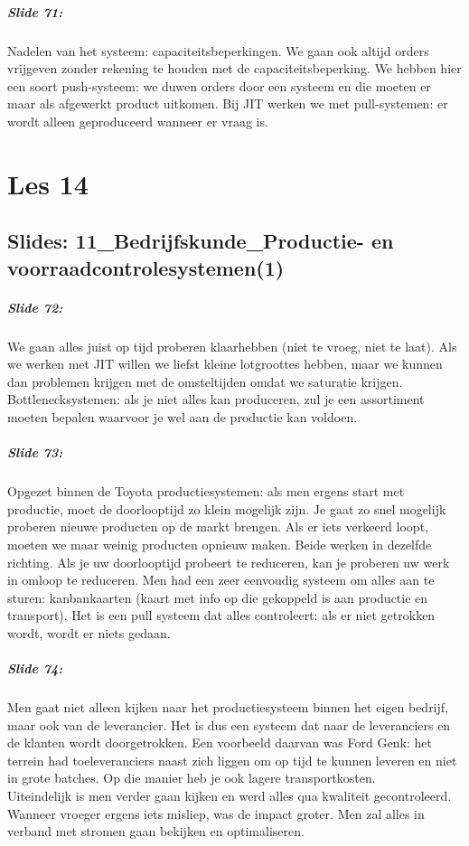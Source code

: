 \documentclass[10pt,a4paper]{report}
\begin{document}
\paragraph{Slide 71:} Nadelen van het systeem: capaciteitsbeperkingen. We gaan ook altijd orders vrijgeven zonder rekening te houden met de capaciteitsbeperking. We hebben hier een soort push-systeem: we duwen orders door een systeem en die moeten er maar als afgewerkt product uitkomen. Bij JIT werken we met pull-systemen: er wordt alleen geproduceerd wanneer er vraag is. 

\chapter{Les 14}
\section{Slides: 11\_Bedrijfskunde\_Productie- en voorraadcontrolesystemen(1)}

\paragraph{Slide 72:} We gaan alles juist op tijd proberen klaarhebben (niet te vroeg, niet te laat). Als we werken met JIT willen we liefst kleine lotgroottes hebben, maar we kunnen dan problemen krijgen met de omsteltijden omdat we saturatie krijgen.\\
Bottlenecksystemen: als je niet alles kan produceren, zul je een assortiment moeten bepalen waarvoor je wel aan de productie kan voldoen.

\paragraph{Slide 73:} Opgezet binnen de Toyota productiesystemen: als men ergens start met productie, moet de doorlooptijd zo klein mogelijk zijn. Je gaat zo snel mogelijk proberen nieuwe producten op de markt brengen. Als er iets verkeerd loopt, moeten we maar weinig producten opnieuw maken. Beide werken in dezelfde richting. Als je uw doorlooptijd probeert te reduceren, kan je proberen uw werk in omloop te reduceren. Men had een zeer eenvoudig systeem om alles aan te sturen: kanbankaarten (kaart met info op die gekoppeld is aan productie en transport). Het is een pull systeem dat alles controleert: als er niet getrokken wordt, wordt er niets gedaan. 

\paragraph{Slide 74:} Men gaat niet alleen kijken naar het productiesysteem binnen het eigen bedrijf, maar ook van de leverancier. Het is dus een systeem dat naar de leveranciers en de klanten wordt doorgetrokken. Een voorbeeld daarvan was Ford Genk: het terrein had toeleveranciers naast zich liggen om op tijd te kunnen leveren en niet in grote batches. Op die manier heb je ook lagere transportkosten. \\
Uiteindelijk is men verder gaan kijken en werd alles qua kwaliteit gecontroleerd. Wanneer vroeger ergens iets misliep, was de impact groter. Men zal alles in verband met stromen gaan bekijken en optimaliseren.
\end{document}
